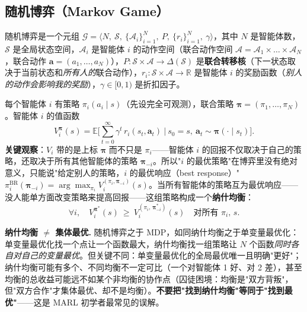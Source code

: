 \subsection{随机博弈（Markov Game）}

\begin{definition}\label{def:sm-markovgame}
随机博弈是一个元组 $\mathcal{G}=\langle N,\ \mathcal{S},\ \{\mathcal{A}_i\}_{i=1}^N,\ P,\ \{r_i\}_{i=1}^N,\ \gamma\rangle$，其中 $N$ 是智能体数，$\mathcal{S}$ 是全局状态空间，$\mathcal{A}_i$ 是智能体 $i$ 的动作空间（联合动作空间 $\boldsymbol{\mathcal{A}}=\mathcal{A}_1\times\dots\times\mathcal{A}_N$，联合动作 $\mathbf{a}=(a_1,\dots,a_N)$），$P:\mathcal{S}\times\boldsymbol{\mathcal{A}}\to\Delta(\mathcal{S})$ 是\textbf{联合转移核}（下一状态取决于当前状态和\emph{所有人的}联合动作），$r_i:\mathcal{S}\times\boldsymbol{\mathcal{A}}\to\mathbb{R}$ 是智能体 $i$ 的奖励函数（\emph{别人的动作会影响我的奖励}），$\gamma\in[0,1)$ 是折扣因子。
\end{definition}

每个智能体 $i$ 有策略 $\pi_i(a_i\mid s)$（先设完全可观测），联合策略 $\boldsymbol{\pi}=(\pi_1,\dots,\pi_N)$。智能体 $i$ 的值函数
\begin{equation}
  V_i^{\boldsymbol{\pi}}(s)=\mathbb{E}\Big[\sum_{t=0}^\infty\gamma^t\,r_i(s_t,\mathbf{a}_t)\ \Big|\ s_0=s,\ \mathbf{a}_t\sim\boldsymbol{\pi}(\cdot\mid s_t)\Big].
  \label{eq:sm-mg-value}
\end{equation}
\textbf{关键观察}：$V_i$ 带的是上标 $\boldsymbol{\pi}$ 而不只是 $\pi_i$——智能体 $i$ 的回报不仅取决于自己的策略，还取决于所有其他智能体的策略 $\boldsymbol{\pi}_{-i}$。所以"$i$ 的最优策略"在博弈里没有绝对意义，只能说"给定别人的策略，$i$ 的最优响应（best response）" $\pi_i^{\text{BR}}(\boldsymbol{\pi}_{-i})=\arg\max_{\pi_i}V_i^{(\pi_i,\boldsymbol{\pi}_{-i})}(s)$。当所有智能体的策略互为最优响应——没人能单方面改变策略来提高回报——这组策略构成一个\textbf{纳什均衡}：
\begin{equation}
  \forall i,\quad V_i^{\boldsymbol{\pi}^*}(s)\ \ge\ V_i^{(\pi_i,\,\boldsymbol{\pi}^*_{-i})}(s)\quad\text{对所有 }\pi_i,\,s.
  \label{eq:sm-nash}
\end{equation}

\begin{note}
\textbf{纳什均衡 $\neq$ 集体最优.}\;
随机博弈之于 MDP，如同纳什均衡之于单变量最优化：单变量最优化找一个点让一个函数最大，纳什均衡找一组策略让 $N$ 个函数\emph{同时各自对自己的变量最优}。但关键不同：单变量最优化的全局最优唯一且明确"更好"；纳什均衡可能有多个、不同均衡不一定可比（一个对智能体 1 好、对 2 差），甚至均衡的总收益可能远不如某个非均衡的协作点（囚徒困境：均衡是"双方背叛"，但"双方合作"才集体最优、却不是均衡）。\textbf{不要把"找到纳什均衡"等同于"找到最优"}——这是 MARL 初学者最常见的误解。
\end{note}

